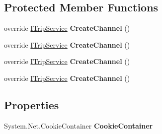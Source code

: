 \subsection*{Protected Member Functions}
\begin{DoxyCompactItemize}
\item 
\hypertarget{class_trip_service_client_a71a136e6c26df71ab71bb63887dab98f}{
override \hyperlink{interface_i_trip_service}{ITripService} {\bfseries CreateChannel} ()}
\label{class_trip_service_client_a71a136e6c26df71ab71bb63887dab98f}

\item 
\hypertarget{class_trip_service_client_a71a136e6c26df71ab71bb63887dab98f}{
override \hyperlink{interface_i_trip_service}{ITripService} {\bfseries CreateChannel} ()}
\label{class_trip_service_client_a71a136e6c26df71ab71bb63887dab98f}

\item 
\hypertarget{class_trip_service_client_a71a136e6c26df71ab71bb63887dab98f}{
override \hyperlink{interface_i_trip_service}{ITripService} {\bfseries CreateChannel} ()}
\label{class_trip_service_client_a71a136e6c26df71ab71bb63887dab98f}

\item 
\hypertarget{class_trip_service_client_a71a136e6c26df71ab71bb63887dab98f}{
override \hyperlink{interface_i_trip_service}{ITripService} {\bfseries CreateChannel} ()}
\label{class_trip_service_client_a71a136e6c26df71ab71bb63887dab98f}

\end{DoxyCompactItemize}
\subsection*{Properties}
\begin{DoxyCompactItemize}
\item 
\hypertarget{class_trip_service_client_a83b39b79b119c9ed9a57af83dfd13907}{
System.Net.CookieContainer {\bfseries CookieContainer}}
\label{class_trip_service_client_a83b39b79b119c9ed9a57af83dfd13907}

\end{DoxyCompactItemize}
